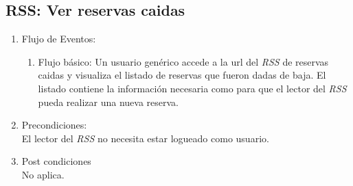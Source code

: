 \documentclass[a4paper,11pt]{article}
\begin{document}

\subsection{RSS: Ver reservas caidas}
\begin{enumerate}


	\begin{enumerate}
		\item Descripción breve: \\
			Se listan los complejos con las \'ultimas reservas caidas.
		\item Actores \\
			Usuario gen\'erico, invitado.
	
		\item Disparadores: \\
			Acceso a la url del \emph{RSS} de reservas caidas.

	\end{enumerate}

	\item Flujo de Eventos: 

	\begin{enumerate}
		\item Flujo básico:
			Un usuario gen\'erico accede a la url del \emph{RSS}  de reservas caidas
			y visualiza el listado de reservas que fueron dadas de baja. El listado
			contiene la informaci\'on necesaria como para que el lector del \emph{RSS}
			pueda realizar una nueva reserva.
	\end{enumerate}

	\item Precondiciones: \\
		El lector del \emph{RSS} no necesita estar logueado como usuario.

	\item Post condiciones \\
		No aplica.

\end{enumerate}

\end{document}
